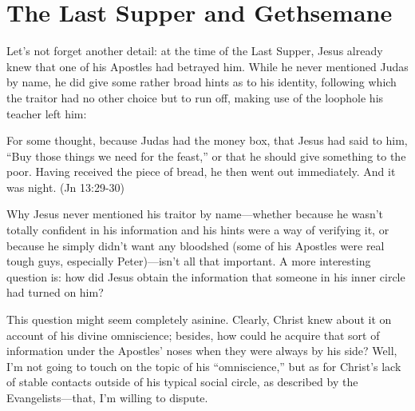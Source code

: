 \chapter*[Who Was Working Behind the Scenes?]{The Last Supper and Gethsemane}

Let's not forget another detail: at the time of the Last Supper, Jesus already knew that one of his Apostles had betrayed him. While he never mentioned Judas by name, he did give some rather broad hints as to his identity, following which the traitor had no other choice but to run off, making use of the loophole his teacher left him:

\begin{smallquote}
    For some thought, because Judas had the money box, that Jesus had said to him, ``Buy those things we need for the feast,'' or that he should give something to the poor. Having received the piece of bread, he then went out immediately. And it was night. (Jn 13:29-30)
\end{smallquote}
Why Jesus never mentioned his traitor by name---whether because he wasn't totally confident in his information and his hints were a way of verifying it, or because he simply didn't want any bloodshed (some of his Apostles were real tough guys, especially Peter)---isn't all that important. A more interesting question is: how did Jesus obtain the information that someone in his inner circle had turned on him?

This question might seem completely asinine. Clearly, Christ knew about it on account of his divine omniscience; besides, how could he acquire that sort of information under the Apostles' noses when they were always by his side? Well, I'm not going to touch on the topic of his ``omniscience,'' but as for Christ's lack of stable contacts outside of his typical social circle, as described by the Evangelists---that, I'm willing to dispute.

